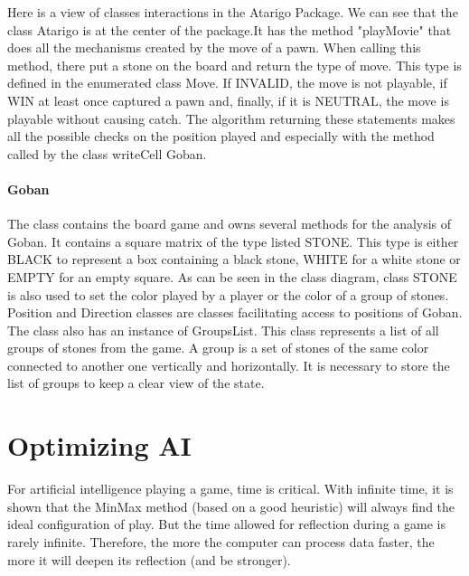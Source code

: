 \documentclass[11pt,a4paper]{report}
\begin{document}
    Here is a view of classes interactions in the Atarigo Package. We can see that the class Atarigo is at the center of the package.It has the method "playMovie" that does all the mechanisms created by the move of a pawn.
    When calling this method, there put a stone on the board and return the type of move. This type is defined in the enumerated class Move. If INVALID, the move is not playable, if WIN at least once captured a pawn and, finally, if it is NEUTRAL, the move is playable without causing catch.
The algorithm returning these statements makes all the possible checks on the position played and especially with the method called by the class writeCell Goban.

\subsubsection*{Goban}


	The class contains the board game and owns several methods for the analysis of Goban. It contains a square matrix of the type listed STONE. This type is either BLACK to represent a box containing a black stone, WHITE for a white stone or EMPTY for an empty square. As can be seen in the class diagram, class STONE is also used to set the color played by a player or the color of a group of stones.\\

Position and Direction classes are classes facilitating access to positions of Goban.\\

    The class also has an instance of GroupsList. This class represents a list of all groups of stones from the game. A group is a set of stones of the same color connected to another one vertically and horizontally. It is necessary to store the list of groups to keep a clear view of the state.

\chapter*{Optimizing AI}
 

For artificial intelligence playing a game, time is critical. With infinite time, it is shown that the MinMax method (based on a good heuristic) will always find the ideal configuration of play. But the time allowed for reflection during a game is rarely infinite. Therefore, the more the computer can process data faster, the more it will deepen its reflection (and be stronger). \\
\end{document}
